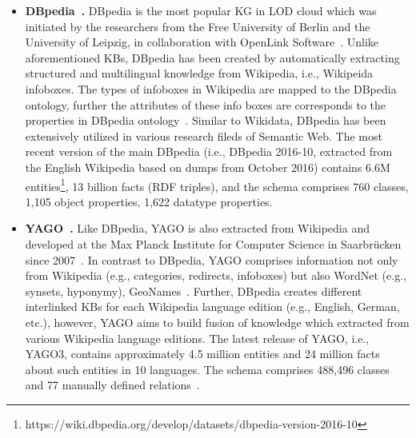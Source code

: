 \begin{itemize}
\item \textbf{DBpedia~\cite{DBLP:conf/semweb/AuerBKLCI07}.} DBpedia is the most popular KG in LOD cloud which was initiated by the researchers from the Free University of Berlin and the University of Leipzig, in collaboration with OpenLink Software~\cite{farber2015comparative}. Unlike aforementioned KBs, DBpedia has been created by automatically extracting structured and multilingual knowledge from Wikipedia, i.e., Wikipeida infoboxes. The types of infoboxes in Wikipedia are mapped to the DBpedia ontology, further the attributes of these info boxes are corresponds to the properties in DBpedia ontology~\cite{DBLP:journals/semweb/Paulheim17}. Similar to Wikidata, DBpedia has been extensively utilized in various research fileds of Semantic Web. The most recent version of the main DBpedia (i.e., DBpedia 2016-10, extracted from the English Wikipedia based on dumps from October 2016) contains 6.6M entities\footnote{https://wiki.dbpedia.org/develop/datasets/dbpedia-version-2016-10}, 13 billion facts (RDF triples), and the schema comprises 760 classes, 1,105 object properties, 1,622 datatype properties.\\

\item \textbf{YAGO~\cite{suchanek2007yago}.} Like DBpedia, YAGO is also extracted from Wikipedia and developed at the Max Planck Institute for Computer Science in Saarbrücken since 2007~\cite{farber2015comparative}. In contrast to DBpedia, YAGO comprises information not only from Wikipedia (e.g., categories, redirects, infoboxes) but also WordNet (e.g., synsets, hyponymy), GeoNames~\cite{farber2015comparative,fabian2007yago}. Further, DBpedia creates different interlinked KBs for each Wikipedia language edition (e.g., English, German, etc.), however, YAGO aims to build fusion of knowledge which extracted from various Wikipedia language editions. The latest release of YAGO, i.e., YAGO3, contains approximately 4.5 million entities and 24 million facts about such  entities  in  10  languages.   The  schema  comprises  488,496  classes  and  77 manually defined relations~\cite{DBLP:conf/cidr/MahdisoltaniBS15}.\\
 

\end{itemize}
